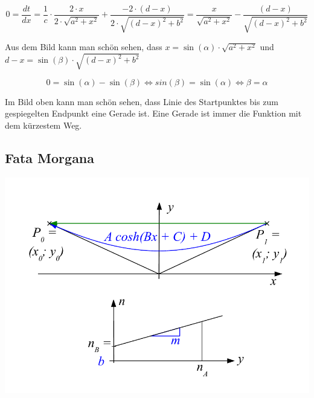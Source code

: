 \[
0 = 
\frac{dt}{dx} =
\frac{1}{c} \cdot
\frac{2 \cdot x}{2 \cdot \sqrt{a^2 + x^2}} + 
\frac{-2 \cdot (d-x)}{2 \cdot \sqrt{(d-x)^2 + b^2}} =
\frac{x}{ \sqrt{a^2 + x^2}} - 
\frac{(d-x)}{ \sqrt{(d-x)^2 + b^2}}
\]

Aus dem Bild kann man schön sehen, dass $x = \sin(\alpha) \cdot \sqrt{a^2 + x^2}$
und $d-x = \sin(\beta) \cdot \sqrt{(d -x)^2 + b^2}$

\[
0 = \sin(\alpha) - \sin(\beta) \Leftrightarrow
sin(\beta) = \sin(\alpha) \Leftrightarrow
\beta = \alpha
\]

Im Bild oben kann man schön sehen, dass Linie des Startpunktes bis zum 
gespiegelten Endpunkt eine Gerade ist. Eine Gerade ist immer die Funktion mit dem kürzestem Weg.



\subsection{Fata Morgana}

\includegraphics{./picture/FataMorgana.pdf}

